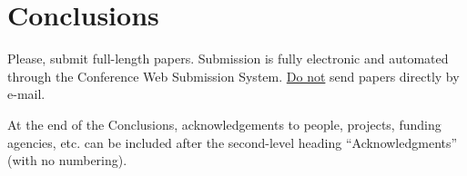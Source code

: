 \documentclass{article}
\begin{document}
\section{Conclusions}
Please, submit full-length papers. Submission is fully electronic and automated through the Conference Web Submission System. \underline{Do not} send papers directly by e-mail.


\begin{acknowledgments}
At the end of the Conclusions, acknowledgements to people, projects, funding agencies, etc. can be included after the second-level heading  ``Acknowledgments'' (with no numbering).
\end{acknowledgments} 


\end{document}
